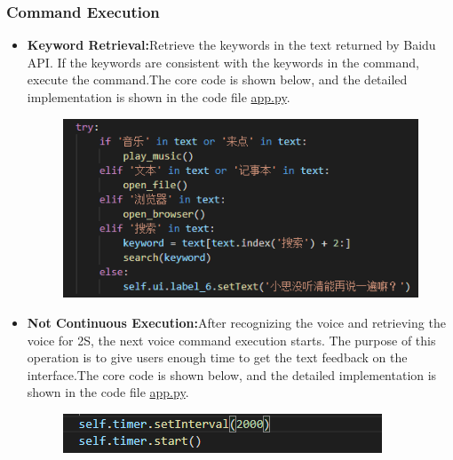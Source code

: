 \documentclass{hci}
\begin{document}
\subsubsection{Command Execution}
\begin{itemize}
	\item \textbf{Keyword Retrieval:}Retrieve the keywords in the text returned by Baidu API. If the keywords are consistent with the keywords in the command, execute the command.The core code is shown below, and the detailed implementation is shown in the code file \underline{app.py}.
	\begin{figure}[h!]
		\centering
		\includegraphics[width=0.8\linewidth]{../picture/12}
		\label{figure11}
	\end{figure}
	\item \textbf{Not Continuous Execution:}After recognizing the voice and retrieving the voice for 2S, the next voice command execution starts. The purpose of this operation is to give users enough time to get the text feedback on the interface.The core code is shown below, and the detailed implementation is shown in the code file \underline{app.py}.
	\begin{figure}[htb]
		\centering
		\includegraphics[width=0.8\linewidth]{../picture/13}
		\label{figure12}
	\end{figure}
\end{itemize}
\end{document}

